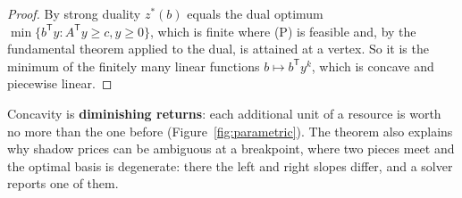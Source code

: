 \documentclass[11pt,a4paper]{article}
\numberwithin{equation}{section}
\theoremstyle{definition}
\begin{document}
\begin{proof}
By strong duality $z^*(b)$ equals the dual optimum $\min\{b^{\mathsf T}y : A^{\mathsf T}y \geq c, y \geq 0\}$, which is finite where (P) is feasible and, by the fundamental theorem applied to the dual, is attained at a vertex. So it is the minimum of the finitely many linear functions $b \mapsto b^{\mathsf T}y^k$, which is concave
and piecewise linear.
\end{proof}

Concavity is \textbf{diminishing returns}: each additional unit of a resource is worth no more than the one before (Figure~\ref{fig:parametric}). The theorem also explains why shadow prices can be ambiguous at a breakpoint, where two pieces meet and the optimal basis is degenerate: there the left and right slopes differ,
and a solver reports one of them.
\end{document}
